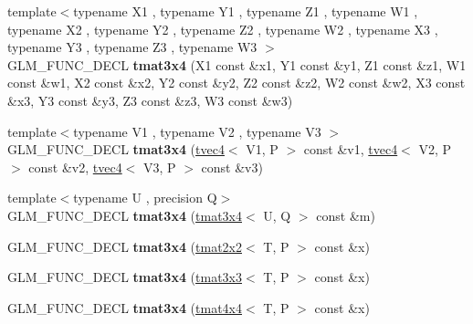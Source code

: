 \begin{DoxyCompactItemize}
\item 
{\footnotesize template$<$typename X1 , typename Y1 , typename Z1 , typename W1 , typename X2 , typename Y2 , typename Z2 , typename W2 , typename X3 , typename Y3 , typename Z3 , typename W3 $>$ }\\G\+L\+M\+\_\+\+F\+U\+N\+C\+\_\+\+D\+E\+CL {\bfseries tmat3x4} (X1 const \&x1, Y1 const \&y1, Z1 const \&z1, W1 const \&w1, X2 const \&x2, Y2 const \&y2, Z2 const \&z2, W2 const \&w2, X3 const \&x3, Y3 const \&y3, Z3 const \&z3, W3 const \&w3)\hypertarget{structglm_1_1detail_1_1tmat3x4_a6fc2dce014e53c227b06f0ad379c92c0}{}\label{structglm_1_1detail_1_1tmat3x4_a6fc2dce014e53c227b06f0ad379c92c0}

\item 
{\footnotesize template$<$typename V1 , typename V2 , typename V3 $>$ }\\G\+L\+M\+\_\+\+F\+U\+N\+C\+\_\+\+D\+E\+CL {\bfseries tmat3x4} (\hyperlink{structglm_1_1detail_1_1tvec4}{tvec4}$<$ V1, P $>$ const \&v1, \hyperlink{structglm_1_1detail_1_1tvec4}{tvec4}$<$ V2, P $>$ const \&v2, \hyperlink{structglm_1_1detail_1_1tvec4}{tvec4}$<$ V3, P $>$ const \&v3)\hypertarget{structglm_1_1detail_1_1tmat3x4_a6d3f2f2f3a7afbec8ec3b441fb904b20}{}\label{structglm_1_1detail_1_1tmat3x4_a6d3f2f2f3a7afbec8ec3b441fb904b20}

\item 
{\footnotesize template$<$typename U , precision Q$>$ }\\G\+L\+M\+\_\+\+F\+U\+N\+C\+\_\+\+D\+E\+CL {\bfseries tmat3x4} (\hyperlink{structglm_1_1detail_1_1tmat3x4}{tmat3x4}$<$ U, Q $>$ const \&m)\hypertarget{structglm_1_1detail_1_1tmat3x4_ac2ddd33140b6f24cf36d4b7e92a8ca02}{}\label{structglm_1_1detail_1_1tmat3x4_ac2ddd33140b6f24cf36d4b7e92a8ca02}

\item 
G\+L\+M\+\_\+\+F\+U\+N\+C\+\_\+\+D\+E\+CL {\bfseries tmat3x4} (\hyperlink{structglm_1_1detail_1_1tmat2x2}{tmat2x2}$<$ T, P $>$ const \&x)\hypertarget{structglm_1_1detail_1_1tmat3x4_aacf61908e9f0d43b3cb3633ff642492f}{}\label{structglm_1_1detail_1_1tmat3x4_aacf61908e9f0d43b3cb3633ff642492f}

\item 
G\+L\+M\+\_\+\+F\+U\+N\+C\+\_\+\+D\+E\+CL {\bfseries tmat3x4} (\hyperlink{structglm_1_1detail_1_1tmat3x3}{tmat3x3}$<$ T, P $>$ const \&x)\hypertarget{structglm_1_1detail_1_1tmat3x4_aed8d51605e3f1eff1a600430a30e99b8}{}\label{structglm_1_1detail_1_1tmat3x4_aed8d51605e3f1eff1a600430a30e99b8}

\item 
G\+L\+M\+\_\+\+F\+U\+N\+C\+\_\+\+D\+E\+CL {\bfseries tmat3x4} (\hyperlink{structglm_1_1detail_1_1tmat4x4}{tmat4x4}$<$ T, P $>$ const \&x)\hypertarget{structglm_1_1detail_1_1tmat3x4_a4cc12711577c849e0106624fc1f3febe}{}\label{structglm_1_1detail_1_1tmat3x4_a4cc12711577c849e0106624fc1f3febe}


\end{DoxyCompactItemize}
